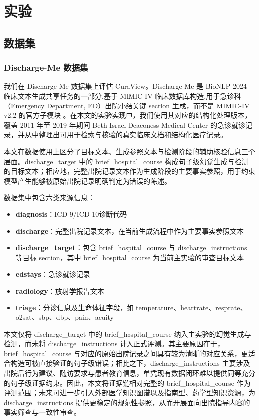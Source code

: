 \documentclass[11pt]{article}
\begin{document}
\section{实验}
\subsection{数据集}

\subsubsection{Discharge-Me 数据集}

我们在 Discharge-Me 数据集上评估 CuraView。Discharge-Me 是 BioNLP 2024 临床文本生成共享任务的一部分,基于 MIMIC-IV 临床数据库构造,用于急诊科（Emergency Department, ED）出院小结关键 section 生成，而不是 MIMIC-IV v2.2 的官方子模块 \citep{stanfordaimi2024dischargeMe,xu2024dischargeMeSharedTask}。在本文的实验实现中，我们使用其对应的结构化处理版本，覆盖 2011 年至 2019 年期间 Beth Israel Deaconess Medical Center 的急诊就诊记录，并从中整理出可用于检索与核验的真实临床文档和结构化医疗记录。

本文在数据使用上区分了目标文本、生成参照文本与检测阶段的辅助核验信息三个层面。discharge\_target 中的 brief\_hospital\_course 构成句子级幻觉生成与检测的目标文本；相应地，完整出院记录文本作为生成阶段的主要事实参照，用于约束模型产生能够被原始出院记录明确判定为错误的陈述。

数据集中包含六类来源信息：

\begin{itemize}
\item
  \textbf{diagnosis}：ICD-9/ICD-10诊断代码
\item
  \textbf{discharge}：完整出院记录文本，在当前生成流程中作为主要事实参照文本
\item
  \textbf{discharge\_target}：包含 brief\_hospital\_course 与 discharge\_instructions 等目标 section，其中 brief\_hospital\_course 为当前主实验的审查目标文本
\item
  \textbf{edstays}：急诊就诊记录
\item
  \textbf{radiology}：放射学报告文本
\item
  \textbf{triage}：分诊信息及生命体征字段，如 temperature、heartrate、resprate、o2sat、sbp、dbp、pain、acuity
\end{itemize}

本文仅将 discharge\_target 中的 brief\_hospital\_course 纳入主实验的幻觉生成与检测，而未将 discharge\_instructions 计入正式评测。其主要原因在于，brief\_hospital\_course 与对应的原始出院记录之间具有较为清晰的对应关系，更适合构造可被直接验证的句子级错误；相比之下，discharge\_instructions 主要涉及出院后行为建议、随访要求与患者教育信息，单凭现有数据闭环难以提供同等充分的句子级证据约束。因此，本文将证据链相对完整的 brief\_hospital\_course 作为评测范围；未来可进一步引入外部医学知识图谱以及指南型、药学型知识资源，为 discharge\_instructions 提供更稳定的规范性参照，从而开展面向出院指导内容的事实筛查与一致性审查。
\end{document}
